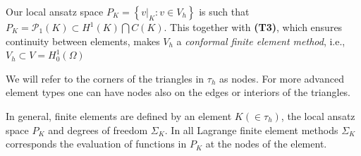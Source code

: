 \documentclass[../Main/main.tex]{subfiles}
\begin{document}
	\begin{remark}
	Our local ansatz space $P_K = \left \{ v|_K:v\in V_h \right \}$ is such that $P_K = \mathcal{P}_1(K) \subset H^1(K) \bigcap C(K)$. This together with \textbf{(T3)}, which ensures continuity between elements, makes $V_h$ a \emph{conformal finite element method}, i.e., $V_h \subset V = H_0^1(\Omega)$
	\end{remark}
	\begin{remark}[Nodes]
		We will refer to the corners of the triangles in $\tau_h$ as nodes. For more advanced element types one can have nodes also on the edges or interiors of the triangles.
	\end{remark}
	\begin{remark}
		In general, finite elements are defined by an element $K(\in \tau_h)$, the local ansatz space $P_K$ and degrees of freedom $\Sigma_K$. In all Lagrange finite element methods $\Sigma_K$ corresponds the evaluation of functions in $P_K$ at the nodes of the element.
	\end{remark}
\end{document}
